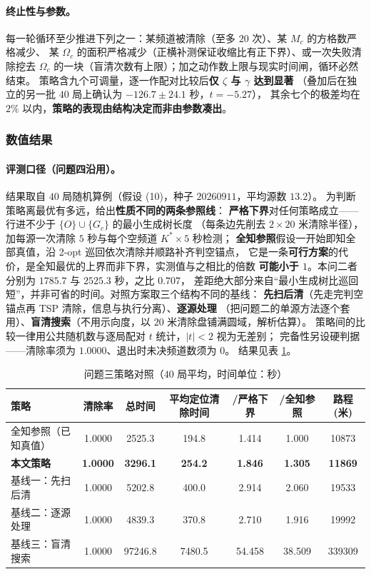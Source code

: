 \documentclass[withoutpreface, bwprint]{cumcmthesis}
\begin{document}
\paragraph{终止性与参数。}
每一轮循环至少推进下列之一：某频道被清除（至多 $20$ 次）、某 $M_c$ 的方格数严格减少、
某 $\Omega_c$ 的面积严格减少（正横补测保证收缩比有正下界）、或一次失败清除挖去
$\Omega_c$ 的一块（盲清次数有上限）；加之动作数上限与现实时间闸，循环必然结束。
策略含九个可调量，逐一作配对比较后\textbf{仅 $\zeta$ 与 $\gamma$ 达到显著}
（叠加后在独立的另一批 $40$ 局上确认为 $-126.7\pm24.1$ 秒，$t=-5.27$），
其余七个的极差均在 $2\%$ 以内，\textbf{策略的表现由结构决定而非由参数凑出}。

\subsubsection{数值结果}
\label{sssec:p3result}

\paragraph{评测口径（问题四沿用）。}
结果取自 $40$ 局随机算例（假设 (10)，种子 $20260911$，平均源数 $13.2$）。
为判断策略离最优有多远，给出\textbf{性质不同的两条参照线}：
\textbf{严格下界}对任何策略成立——行进不少于 $\{O\}\cup\{G_c\}$ 的最小生成树长度
（每条边先削去 $2\times20$ 米清除半径），加每源一次清除 $5$ 秒与每个空频道 $K^{*}\times5$ 秒检测；
\textbf{全知参照}假设一开始即知全部真值，沿 2-opt 巡回\cite{croes}依次清除并顺路补齐判空锚点，
它是一条\textbf{可行方案}的代价，是全知最优的上界而非下界，实测值与之相比的倍数
\textbf{可能小于 $1$}。本问二者分别为 $1785.7$ 与 $2525.3$ 秒，之比 $0.707$，
差距绝大部分来自“最小生成树比巡回短”，并非可省的时间。对照方案取三个结构不同的基线：
\textbf{先扫后清}（先走完判空锚点再 TSP 清除，信息与执行分离）、\textbf{逐源处理}
（把问题二的单源方法逐个套用）、\textbf{盲清搜索}（不用示向度，以 $20$ 米清除盘铺满圆域，解析估算）。
策略间的比较一律用公共随机数与逐局配对 $t$ 统计，$\lvert t\rvert<2$ 视为无差别；
完备性另设硬判据——清除率须为 $1.0000$、退出时未决频道数须为 $0$。
结果见表 \ref{tab:p3compare}。

\begin{table}[H]
  \centering
  \caption{问题三策略对照（$40$ 局平均，时间单位：秒）}
  \label{tab:p3compare}
  \footnotesize
  \begin{tabularx}{\textwidth}{Xcccccc}
    \toprule
    策略 & 清除率 & 总时间 & 平均定位清除时间 & /严格下界 & /全知参照 & 路程(米) \\
    \midrule
    全知参照（已知真值） & 1.0000 & 2525.3 & 194.8 & 1.414 & 1.000 & 10873 \\
    \textbf{本文策略} & \textbf{1.0000} & \textbf{3296.1} & \textbf{254.2}
      & \textbf{1.846} & \textbf{1.305} & \textbf{11869} \\
    基线一：先扫后清 & 1.0000 & 5202.8 & 400.0 & 2.914 & 2.060 & 19533 \\
    基线二：逐源处理 & 1.0000 & 4839.3 & 370.8 & 2.710 & 1.916 & 19992 \\
    基线三：盲清搜索 & 1.0000 & 97246.8 & 7480.5 & 54.458 & 38.509 & 339309 \\
    \bottomrule
  \end{tabularx}
\end{table}
\end{document}
